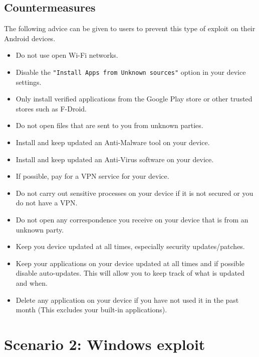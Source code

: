 \documentclass[a4paper, 12pt, titlepage]{report}
\begin{document}
\section{Countermeasures}
The following advice can be given to users to prevent this type of exploit on their Android devices.
\begin{itemize}
    \item Do not use open Wi-Fi networks.
    \item Disable the \texttt{"Install Apps from Unknown sources"} option in your device settings.
    \item Only install verified applications from the Google Play store or other trusted stores such as F-Droid.
    \item Do not open files that are sent to you from unknown parties.
    \item Install and keep updated an Anti-Malware tool on your device.
    \item Install and keep updated an Anti-Virus software on your device.
    \item If possible, pay for a VPN service for your device.
    \item Do not carry out sensitive processes on your device if it is not secured or you do not have a VPN.
    \item Do not open any correspondence you receive on your device that is from an unknown party.
    \item Keep you device updated at all times, especially security updates/patches.
    \item Keep your applications on your device updated at all times and if possible disable auto-updates. This will allow you to keep track of what is updated and when.
    \item Delete any application on your device if you have not used it in the past month (This excludes your built-in applications).
\end{itemize}
\chapter{Scenario 2: Windows exploit}
\end{document}

